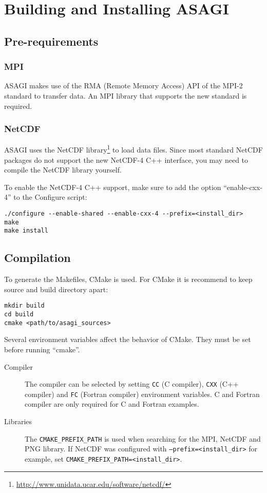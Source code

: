 \section{Building and Installing ASAGI}

\subsection{Pre-requirements}

\subsubsection{MPI}

ASAGI makes use of the RMA (Remote Memory Access) API of the MPI-2 standard to transfer data. An MPI library that supports the new standard is required.

\subsubsection{NetCDF}

ASAGI uses the NetCDF library\footnote{\url{http://www.unidata.ucar.edu/software/netcdf/}} to load data files. Since most standard NetCDF packages do not support the new NetCDF-4 C++ interface, you may need to compile the NetCDF library yourself.

To enable the NetCDF-4 C++ support, make sure to add the option ``enable-cxx-4'' to the Configure script:

\lstset{language=bash}
\begin{lstlisting}
./configure --enable-shared --enable-cxx-4 --prefix=<install_dir>
make
make install
\end{lstlisting}

\subsection{Compilation}
\label{sec:compilation}

To generate the Makefiles, CMake is used. For CMake it is recommend to keep source and build directory apart:

\lstset{language=bash}
\begin{lstlisting}
mkdir build
cd build
cmake <path/to/asagi_sources>
\end{lstlisting}

Several environment variables affect the behavior of CMake. They must be set before running ``cmake''.

\begin{description}
 \item[Compiler] The compiler can be selected by setting \texttt{CC} (C compiler), \texttt{CXX} (C++ compiler) and \texttt{FC} (Fortran compiler) environment variables. C and Fortran compiler are only required for C and Fortran examples.
 \item[Libraries] The \texttt{CMAKE\_PREFIX\_PATH} is used when searching for the MPI, Net\-CDF and PNG library. If NetCDF was configured with \texttt{--prefix=<in\-stall\_dir>} for example, set \texttt{CMAKE\_PREFIX\_PATH=<install\_dir>}.
\end{description}

